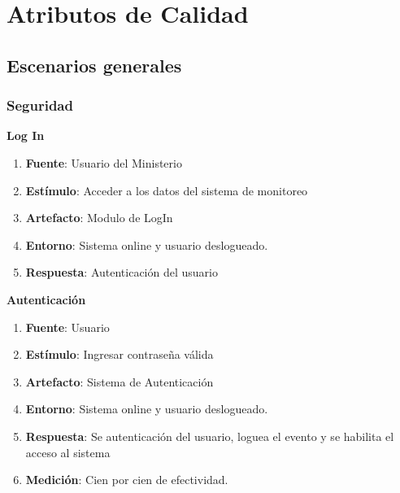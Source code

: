\section{Atributos de Calidad}

\subsection{Escenarios generales}

\subsubsection{Seguridad}


{\bf Log In}
\begin{enumerate}
\item {\bf Fuente}: Usuario del Ministerio
\item {\bf Estímulo}: Acceder a los datos del sistema de monitoreo
\item {\bf Artefacto}: Modulo de LogIn
\item {\bf Entorno}: Sistema online y usuario deslogueado. 
\item {\bf Respuesta}: Autenticación del usuario
\end{enumerate}

{\bf Autenticación}
\begin{enumerate}
\item {\bf Fuente}: Usuario
\item {\bf Estímulo}: Ingresar contraseña válida
\item {\bf Artefacto}: Sistema de Autenticación
\item {\bf Entorno}: Sistema online y usuario deslogueado. 
\item {\bf Respuesta}: Se autenticación del usuario, loguea el evento y se habilita el acceso al sistema
\item {\bf Medición}: Cien por cien de efectividad.
\end{enumerate}

